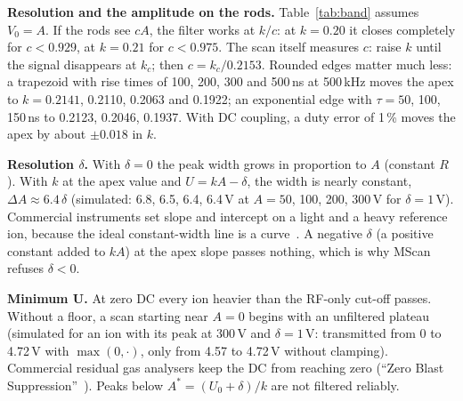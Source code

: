 \documentclass[10pt,a4paper]{article}
\begin{document}
\textbf{Resolution and the amplitude on the rods.} Table~\ref{tab:band} assumes $V_0=A$. If the rods
see $cA$, the filter works at $k/c$: at $k=0.20$ it closes completely for $c<0.929$, at $k=0.21$ for
$c<0.975$. The scan itself measures $c$: raise $k$ until the signal disappears at $k_c$; then
$c=k_c/0.2153$. Rounded edges matter much less: a trapezoid with rise times of 100, 200, 300 and
500\,ns at 500\,kHz moves the apex to $k=0.2141$, 0.2110, 0.2063 and 0.1922; an exponential edge
with $\tau=50$, 100, 150\,ns to 0.2123, 0.2046, 0.1937. With DC coupling, a duty error of 1\,\% moves
the apex by about $\pm0.018$ in $k$.

\textbf{Resolution $\delta$.}\label{sec:delta} With $\delta=0$ the peak width grows in
proportion to $A$ (constant $R$). With $k$ at the apex value and $U=kA-\delta$, the width is nearly
constant, $\Delta A\approx6.4\,\delta$ (simulated: 6.8, 6.5, 6.4, 6.4\,V at $A=50$, 100, 200, 300\,V
for $\delta=1$\,V). Commercial instruments set slope and intercept on a light and a heavy reference
ion, because the ideal constant-width line is a curve~\cite{pedder}. A negative $\delta$ (a positive
constant added to $kA$) at the apex slope passes nothing, which is why MScan refuses $\delta<0$.

\textbf{Minimum U.}\label{sec:floor} At zero DC every ion heavier than the RF-only cut-off passes.
Without a floor, a scan starting near $A=0$ begins with an unfiltered plateau (simulated for an ion
with its peak at 300\,V and $\delta=1$\,V: transmitted from 0 to 4.72\,V with $\max(0,\cdot)$, only from
4.57 to 4.72\,V without clamping). Commercial residual gas analysers keep the DC from reaching zero
(``Zero Blast Suppression''~\cite{srs}). Peaks below $A^*=(U_0+\delta)/k$ are not filtered reliably.
\end{document}

